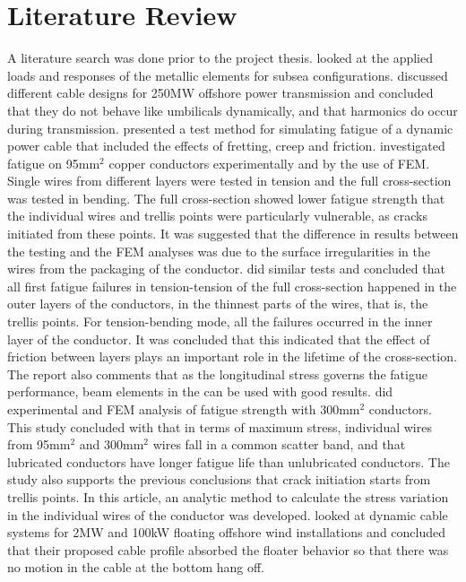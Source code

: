 \section{Literature Review}
A literature search was done prior to the project thesis. \cite{Feld1995} looked at the applied loads and responses of the metallic elements for subsea configurations. \cite{Chien2004} discussed different cable designs for 250MW offshore power transmission and concluded that they do not behave like umbilicals dynamically, and that harmonics do occur during transmission. \cite{Karlsen2010} presented a test method for simulating fatigue of a dynamic power cable that included the effects of fretting, creep and friction. \cite{Nasution2013} investigated fatigue on 95mm$^2$ copper conductors experimentally and by the use of FEM. Single wires from different layers were tested in tension and the full cross-section was tested in bending. The full cross-section showed lower fatigue strength that the individual wires and trellis points were particularly vulnerable, as cracks initiated from these points. It was suggested that the difference in results between the testing and the FEM analyses was due to the surface irregularities in the wires from the packaging of the conductor. \cite{NASUTION2014} did similar tests and concluded that all first fatigue failures in tension-tension of the full cross-section happened in the outer layers of the conductors, in the thinnest parts of the wires, that is, the trellis points. For tension-bending mode, all the failures occurred in the inner layer of the conductor. It was concluded that this indicated that the effect of friction between layers plays an important role in the lifetime of the cross-section. The report also comments that as the longitudinal stress governs the fatigue performance, beam elements in the can be used with good results. \cite{savik2014} did experimental and FEM analysis of fatigue strength with 300mm$^2$ conductors. This study concluded with that in terms of maximum stress, individual wires from 95mm$^2$  and 300mm$^2$ wires fall in a common scatter band, and that lubricated conductors have longer fatigue life than unlubricated conductors. The study also supports the previous conclusions that crack initiation starts from trellis points. In this article, an analytic method to calculate the stress variation in the individual wires of the conductor was developed. \cite{Taninok2017} looked at dynamic cable systems for 2MW and 100kW floating offshore wind installations and concluded that their proposed cable profile absorbed the floater behavior so that there was no motion in the cable at the bottom hang off.  

